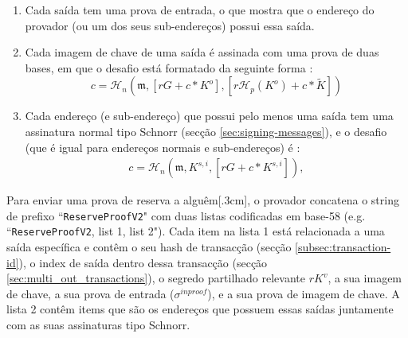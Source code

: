\begin{enumerate}
    \item Cada saída tem uma prova de entrada, o que mostra que o endereço do provador (ou um dos seus sub-endereços) possui essa saída. 
    \item Cada imagem de chave de uma saída é assinada com uma prova de duas bases, em que o desafio está formatado da seguinte forma : 
    \[c = \mathcal{H}_n(\mathfrak{m}, [r G + c*K^o], [r \mathcal{H}_p(K^o) + c*\tilde{K}])\]
    \item Cada endereço (e sub-endereço) que possui pelo menos uma saída tem uma assinatura normal tipo Schnorr (secção \ref{sec:signing-messages}), e o desafio (que é igual para endereços normais e sub-endereços) é : 
\begin{align*}
c = \mathcal{H}_n(\mathfrak{m}, K^{s,i}, [r G + c*K^{s,i}]) ,
\end{align*}

\end{enumerate}{}
Para enviar uma prova de reserva a alguêm[.3cm], o provador concatena o string de prefixo ``{\tt ReserveProofV2}" com duas listas codificadas em base-58 (e.g. ``{\tt ReserveProofV2}, list 1, list 2"). Cada item na lista 1 está relacionada a uma saída específica e contêm o seu hash de transacção (secção \ref{subsec:transaction-id}), o index de saída dentro dessa transacção (secção \ref{sec:multi_out_transactions}), o segredo partilhado relevante $r K^v$, a sua imagem de chave, a sua prova de entrada ($\sigma^{inproof}$), e a sua prova de imagem de chave. A lista 2 contêm items que são os endereços que possuem essas saídas juntamente com as suas assinaturas tipo Schnorr.

